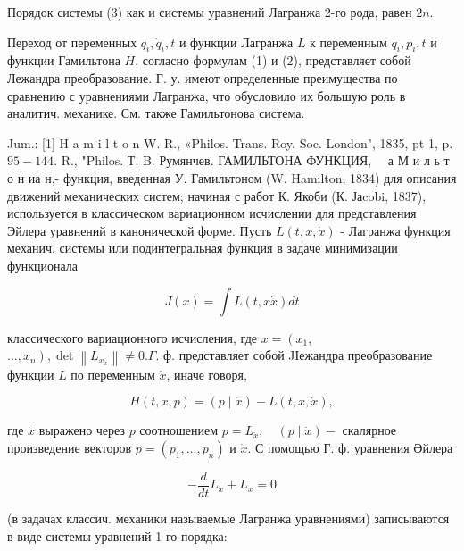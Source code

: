 \documentclass[10pt]{article}
\begin{document}
Порядок системы (3) как и системы уравнений Лагранжа 2-го рода, равен $2 n$.



Переход от переменных $q_{i}, \dot{q}_{i}, t$ и функции Лагранжа $L$ к переменным $q_{i}, p_{i}, t$ и функции Гамильтона $H$, согласно формулам (1) и (2), представляет собой Лежандра преобразование. Г. у. имеют определенные преимущества по сравнению с уравнениями Лагранжа, что обусловило их большую роль в аналитич. механике. См. также Гамильтонова система.



Jum.: [1] H a m i l t o n W. R., «Philos. Trans. Roy. Soc. London", 1835, pt 1, p. $95-144$. R., "Philos. Т. B. Румянчев. ГАМИЛЬТОНА ФУНКЦИЯ, $\quad \mathbf{а}$ М и л ь т о н иа н,- функция, введенная У. Гамильтоном (W. Hamilton, 1834) для описания движений механических систем; начиная с работ К. Якоби (К. Јаcobi, 1837), используется в классическом вариационном исчислении для представления Эйлера уравнений в канонической форме. Пусть $L(t, x, \dot{x})$ - Лагранжа функция механич. системы или подинтегральная функция в задаче минимизации функционала



\[

J(x)=\int L(t, x \dot{x}) d t

\]



классического вариационного исчисления, где $x=\left(x_{1}\right.$, $\left.\ldots, x_{n}\right), \operatorname{det}\left\|L_{x_{\dot{x}}}\right\| \neq 0 . \Gamma$. ф. представляет собой JІежандра преобразование функции $L$ по переменным $\dot{x}$, иначе говоря,



\[

H(t, x, p)=(p \mid \dot{x})-L(t, x, \dot{x}),

\]



где $\dot{x}$ выражено через $p$ соотношением $p=L_{\ddot{x}} ; \quad(p \mid \dot{x})-$ скалярное произведение векторов $p=\left(p_{1}, \ldots, p_{n}\right)$ и $\dot{x}$. С помощью Г. ф. уравнения Әйлера



\[

-\frac{d}{d t} L_{\dot{x}}+L_{x}=0

\]



(в задачах классич. механики называемые Лагранжа уравнениями) записываются в виде системы уравнений 1-го порядка:
\end{document}

